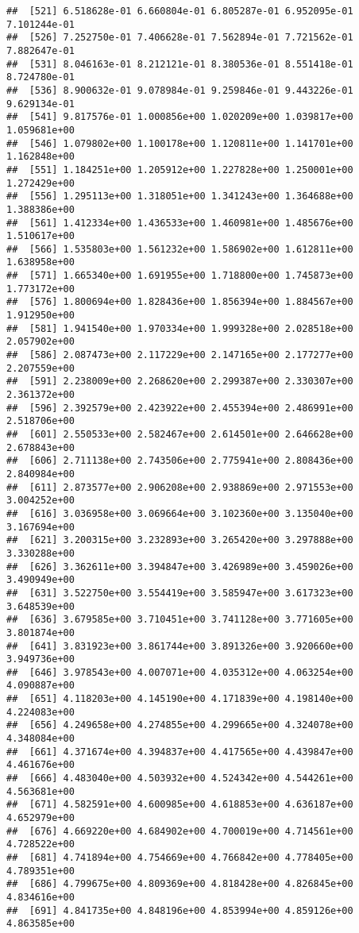 \documentclass[
]{article}
\begin{document}
\begin{verbatim}
##  [521] 6.518628e-01 6.660804e-01 6.805287e-01 6.952095e-01 7.101244e-01
##  [526] 7.252750e-01 7.406628e-01 7.562894e-01 7.721562e-01 7.882647e-01
##  [531] 8.046163e-01 8.212121e-01 8.380536e-01 8.551418e-01 8.724780e-01
##  [536] 8.900632e-01 9.078984e-01 9.259846e-01 9.443226e-01 9.629134e-01
##  [541] 9.817576e-01 1.000856e+00 1.020209e+00 1.039817e+00 1.059681e+00
##  [546] 1.079802e+00 1.100178e+00 1.120811e+00 1.141701e+00 1.162848e+00
##  [551] 1.184251e+00 1.205912e+00 1.227828e+00 1.250001e+00 1.272429e+00
##  [556] 1.295113e+00 1.318051e+00 1.341243e+00 1.364688e+00 1.388386e+00
##  [561] 1.412334e+00 1.436533e+00 1.460981e+00 1.485676e+00 1.510617e+00
##  [566] 1.535803e+00 1.561232e+00 1.586902e+00 1.612811e+00 1.638958e+00
##  [571] 1.665340e+00 1.691955e+00 1.718800e+00 1.745873e+00 1.773172e+00
##  [576] 1.800694e+00 1.828436e+00 1.856394e+00 1.884567e+00 1.912950e+00
##  [581] 1.941540e+00 1.970334e+00 1.999328e+00 2.028518e+00 2.057902e+00
##  [586] 2.087473e+00 2.117229e+00 2.147165e+00 2.177277e+00 2.207559e+00
##  [591] 2.238009e+00 2.268620e+00 2.299387e+00 2.330307e+00 2.361372e+00
##  [596] 2.392579e+00 2.423922e+00 2.455394e+00 2.486991e+00 2.518706e+00
##  [601] 2.550533e+00 2.582467e+00 2.614501e+00 2.646628e+00 2.678843e+00
##  [606] 2.711138e+00 2.743506e+00 2.775941e+00 2.808436e+00 2.840984e+00
##  [611] 2.873577e+00 2.906208e+00 2.938869e+00 2.971553e+00 3.004252e+00
##  [616] 3.036958e+00 3.069664e+00 3.102360e+00 3.135040e+00 3.167694e+00
##  [621] 3.200315e+00 3.232893e+00 3.265420e+00 3.297888e+00 3.330288e+00
##  [626] 3.362611e+00 3.394847e+00 3.426989e+00 3.459026e+00 3.490949e+00
##  [631] 3.522750e+00 3.554419e+00 3.585947e+00 3.617323e+00 3.648539e+00
##  [636] 3.679585e+00 3.710451e+00 3.741128e+00 3.771605e+00 3.801874e+00
##  [641] 3.831923e+00 3.861744e+00 3.891326e+00 3.920660e+00 3.949736e+00
##  [646] 3.978543e+00 4.007071e+00 4.035312e+00 4.063254e+00 4.090887e+00
##  [651] 4.118203e+00 4.145190e+00 4.171839e+00 4.198140e+00 4.224083e+00
##  [656] 4.249658e+00 4.274855e+00 4.299665e+00 4.324078e+00 4.348084e+00
##  [661] 4.371674e+00 4.394837e+00 4.417565e+00 4.439847e+00 4.461676e+00
##  [666] 4.483040e+00 4.503932e+00 4.524342e+00 4.544261e+00 4.563681e+00
##  [671] 4.582591e+00 4.600985e+00 4.618853e+00 4.636187e+00 4.652979e+00
##  [676] 4.669220e+00 4.684902e+00 4.700019e+00 4.714561e+00 4.728522e+00
##  [681] 4.741894e+00 4.754669e+00 4.766842e+00 4.778405e+00 4.789351e+00
##  [686] 4.799675e+00 4.809369e+00 4.818428e+00 4.826845e+00 4.834616e+00
##  [691] 4.841735e+00 4.848196e+00 4.853994e+00 4.859126e+00 4.863585e+00

\end{verbatim}
\end{document}

